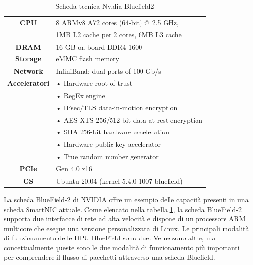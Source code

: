 \documentclass[binding=0.6cm]{sapthesis}
\theoremstyle{definition}
\begin{document}
\begin{table}[ht]

    \centering
    \begin{tabular}[t]{|c|l|}
    \hline

    \hline
    \textbf{CPU} & 8 ARMv8 A72 cores (64-bit) @ 2.5 GHz,\\
    &1MB L2 cache per 2 cores, 6MB L3 cache\\
    \hline
    \textbf{DRAM}& 16 GB on-board DDR4-1600\\
    \hline
    \textbf{Storage}&eMMC flash memory\\
    \hline
    \textbf{Network}&InfiniBand:
    dual ports of 100 Gb/s\\
    \hline
    \textbf{Acceleratori}
    & • Hardware root of trust\\
    & • RegEx engine\\
    & • IPsec/TLS data-in-motion encryption\\
    & • AES-XTS 256/512-bit data-at-rest encryption\\
    & • SHA 256-bit hardware acceleration\\
    & • Hardware public key accelerator\\
    & • True random number generator\\
    \hline
    \textbf{PCIe}&Gen 4.0 x16\\
    \hline
    \textbf{OS}&Ubuntu 20.04 (kernel 5.4.0-1007-bluefield)\\
    

    \hline
    
    \hline
    
    \end{tabular}
    \caption{Scheda tecnica Nvidia Bluefield2}
    \label{tab:datasheet}
\end{table}

La scheda BlueField-2 di NVIDIA offre un esempio 
delle capacità presenti in una scheda SmartNIC attuale.
Come elencato nella tabella \ref{tab:datasheet}, la scheda BlueField-2 supporta due interfacce di rete 
ad alta velocità e dispone di un processore ARM multicore che esegue una versione personalizzata di Linux. 
Le principali modalità di funzionamento delle DPU BlueField sono due. 
Ve ne sono altre, ma concettualmente queste sono le due modalità di funzionamento più importanti per comprendere il flusso di pacchetti attraverso una scheda Bluefield. 
\end{document}
